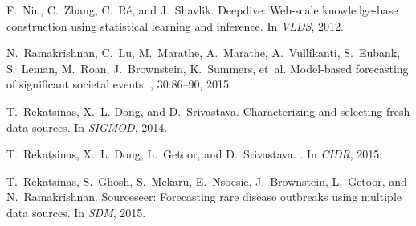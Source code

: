 \documentclass{sig-alternate-05-2015}
\begin{document}
{\begin{thebibliography}{10}
F.~Niu, C.~Zhang, C.~R\'e, and J.~Shavlik.
\newblock Deepdive: Web-scale knowledge-base construction using statistical
  learning and inference.
\newblock In {\em VLDS}, 2012.

N.~Ramakrishnan, C.~Lu, M.~Marathe, A.~Marathe, A.~Vullikanti, S.~Eubank,
  S.~Leman, M.~Roan, J.~Brownstein, K.~Summers, et~al.
\newblock Model-based forecasting of significant societal events.
, 30:86--90, 2015.

T.~Rekatsinas, X.~L. Dong, and D.~Srivastava.
\newblock Characterizing and selecting fresh data sources.
\newblock In {\em SIGMOD}, 2014.

T.~Rekatsinas, X.~L. Dong, L.~Getoor, and D.~Srivastava.
.
\newblock In {\em CIDR}, 2015.

T.~Rekatsinas, S.~Ghosh, S.~Mekaru, E.~Nsoesie, J.~Brownstein, L.~Getoor, and
  N.~Ramakrishnan.
\newblock Sourceseer: Forecasting rare disease outbreaks using multiple data
  sources.
\newblock In {\em SDM}, 2015.

\end{thebibliography}}

%
\end{document}
